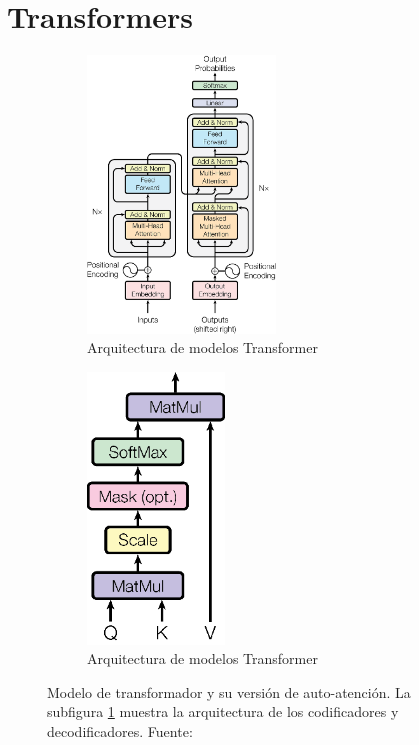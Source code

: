 \section{Transformers}

\begin{figure}[t]
    \centering
    \begin{subfigure}[]{0.55\textwidth}
        \centering
        \includegraphics[width=0.55\textwidth]{img/02/transformer_architecture.png}
        \caption{Arquitectura de modelos Transformer}
        \label{fig:transformer_architecture}
    \end{subfigure}
    \begin{subfigure}[]{0.40\textwidth}
        \centering
        \includegraphics[width=0.40\textwidth]{img/02/scaled_self_attention.png}
        \caption{Arquitectura de modelos Transformer}
        \label{fig:scaled_self_attention}
    \end{subfigure}
    \caption{Modelo de transformador y su versión de auto-atención. La subfigura \ref{fig:transformer_architecture} muestra la arquitectura de los codificadores y decodificadores. Fuente: \citet{vaswani2017attention}}
    \label{fig:transformer_mechanism}
\end{figure}

